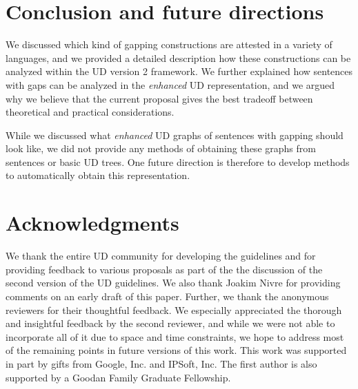\documentclass[11pt]{article}
\begin{document}
\section{Conclusion and future directions}

We discussed which kind of gapping constructions are attested in a variety of languages, and we provided a detailed description how these constructions can be analyzed within the UD version 2 framework. We further explained how sentences with gaps can be analyzed in the \textit{enhanced} UD representation, and we argued why we believe that the current proposal gives the best tradeoff between theoretical and practical considerations.

While we discussed what \textit{enhanced} UD graphs of sentences with gapping should look like, we did not provide any methods of obtaining these graphs from sentences or basic UD trees. One future direction is therefore to develop methods to automatically obtain this representation.


\section*{Acknowledgments}
We thank the entire UD community for 
developing the guidelines
and for providing feedback to various proposals as part of the 
the discussion of the second version of the UD guidelines.
We also thank Joakim Nivre for providing
comments on an early draft of this paper. Further, we thank the 
anonymous reviewers for their thoughtful feedback. We especially
appreciated the thorough and insightful feedback by the second reviewer, and while
we were not able to incorporate all of it due to space and time constraints, 
we hope to address most of the remaining points in future versions of this work.
This work was supported in part by gifts from Google, Inc. and IPSoft, Inc. 
The first author is also supported by a Goodan Family Graduate Fellowship.







\end{document}

